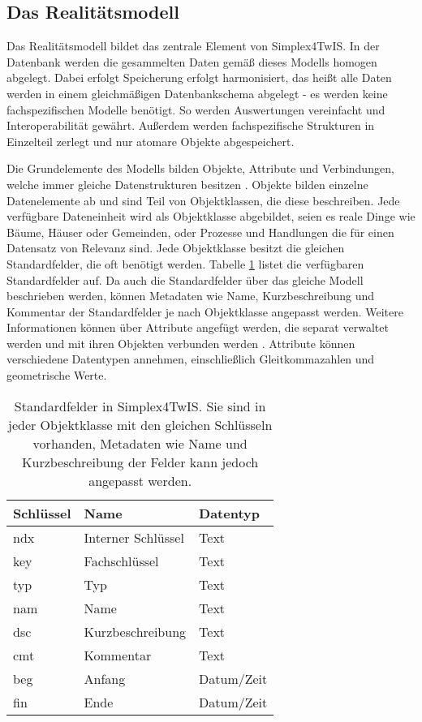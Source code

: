 \subsection{Das Realitätsmodell}
\label{sec:simplex-reality}

Das Realitätsmodell bildet das zentrale Element von Simplex4TwIS. In der Datenbank werden die gesammelten Daten gemäß dieses Modells homogen abgelegt. Dabei erfolgt Speicherung erfolgt harmonisiert, das heißt alle Daten werden in einem gleichmäßigen Datenbankschema abgelegt - es werden keine fachspezifischen Modelle benötigt. So werden Auswertungen vereinfacht und Interoperabilität gewährt. Außerdem werden fachspezifische Strukturen in Einzelteil zerlegt und nur atomare Objekte abgespeichert.

Die Grundelemente des Modells bilden Objekte, Attribute und Verbindungen, welche immer gleiche Datenstrukturen besitzen \parencite{grossmannFachsystemeSchemaevolution2024}. Objekte bilden einzelne Datenelemente ab und sind Teil von Objektklassen, die diese beschreiben. Jede verfügbare Dateneinheit wird als Objektklasse abgebildet, seien es reale Dinge wie Bäume, Häuser oder Gemeinden, oder Prozesse und Handlungen die für einen Datensatz von Relevanz sind. Jede Objektklasse besitzt die gleichen Standardfelder, die oft benötigt werden. Tabelle \ref{tab:s4d-fields} listet die verfügbaren Standardfelder auf. Da auch die Standardfelder über das gleiche Modell beschrieben werden, können Metadaten wie Name, Kurzbeschreibung und Kommentar der Standardfelder je nach Objektklasse angepasst werden. Weitere Informationen können über Attribute angefügt werden, die separat verwaltet werden und mit ihren Objekten verbunden werden \parencite{grossmannFachsystemeSchemaevolution2024}. Attribute können verschiedene Datentypen annehmen, einschließlich Gleitkommazahlen und geometrische Werte.

\begin{table}[!ht]
  \centering
  \begin{tabular}{|| l | l | l ||}
    \hline
    Schlüssel & Name               & Datentyp   \\[0.5ex]
    \hline\hline
    ndx       & Interner Schlüssel & Text       \\
    key       & Fachschlüssel      & Text       \\
    typ       & Typ                & Text       \\
    nam       & Name               & Text       \\
    dsc       & Kurzbeschreibung   & Text       \\
    cmt       & Kommentar          & Text       \\
    beg       & Anfang             & Datum/Zeit \\
    fin       & Ende               & Datum/Zeit \\
    \hline
  \end{tabular}
  \caption{Standardfelder in Simplex4TwIS. Sie sind in jeder Objektklasse mit den gleichen Schlüsseln vorhanden, Metadaten wie Name und Kurzbeschreibung der Felder kann jedoch angepasst werden. \parencite{simplex4datagmbhSimplex4TwIS}}
  \label{tab:s4d-fields}
\end{table}


